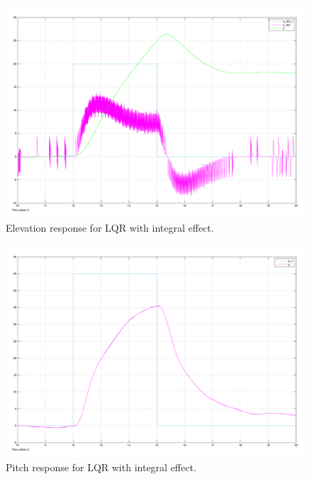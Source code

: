 \begin{figure}[!htb]
	\centering
	\includegraphics[width=\textwidth]{plots/P3p3_LQR_with_integral_elevation.pdf}
	\caption{Elevation response for LQR with integral effect.}
\label{fig:P3p3ElevWithIntegral}
\end{figure}

\begin{figure}[!htb]
	\centering
	\includegraphics[width=\textwidth]{plots/P3p3_LQR_with_integral_pitch.pdf}
	\caption{Pitch response for LQR with integral effect.}
\label{fig:P3p2PitchWithIntegral}
\end{figure}

